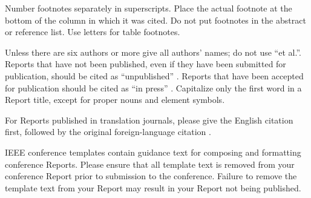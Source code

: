 \documentclass[conference]{IEEEtran}
\begin{document}
Number footnotes separately in superscripts. Place the actual footnote at 
the bottom of the column in which it was cited. Do not put footnotes in the 
abstract or reference list. Use letters for table footnotes.

Unless there are six authors or more give all authors' names; do not use 
``et al.''. Reports that have not been published, even if they have been 
submitted for publication, should be cited as ``unpublished'' \cite{bayesian_vsr_2014}. Reports 
that have been accepted for publication should be cited as ``in press'' \cite{bayesian_vsr_2014}. 
Capitalize only the first word in a Report title, except for proper nouns and 
element symbols.

For Reports published in translation journals, please give the English 
citation first, followed by the original foreign-language citation \cite{bayesian_vsr_2014}.

\vspace{12pt}
\color{red}
IEEE conference templates contain guidance text for composing and formatting conference Reports. Please ensure that all template text is removed from your conference Report prior to submission to the conference. Failure to remove the template text from your Report may result in your Report not being published.


\end{document}
